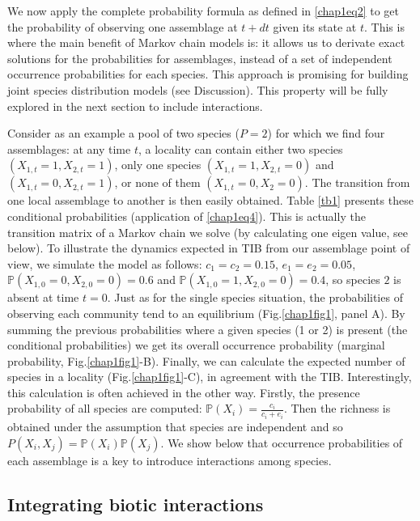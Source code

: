 We now apply the complete probability formula as defined in \eqref{chap1eq2} to get the probability of observing one assemblage at $t+dt$ given its state at $t$. This is where the main benefit of Markov chain models is: it allows us to derivate exact solutions for the probabilities for assemblages, instead of a set of independent occurrence probabilities for each species. This approach is promising for building joint species distribution models (see Discussion). This property will be fully explored in the next section to include interactions.

Consider as an example a pool of two species ($P=2$) for which we find four assemblages: at any time $t$, a locality can contain either two species $(X_{1,t}=1, X_{2,t}=1)$, only one species $(X_{1,t}=1, X_{2,t}=0)$ and $(X_{1,t}=0, X_{2,t}=1)$, or none of them $(X_{1,t}=0, X_2=0)$. The transition from one local assemblage to another is then easily obtained. Table \ref{tb1} presents these conditional probabilities (application of \eqref{chap1eq4}). This is actually the transition matrix of a Markov chain we solve (by calculating one eigen value, see below). To illustrate the dynamics expected in TIB from our assemblage point of view, we simulate the model as follows: $c_1=c_2=0.15$, $e_1=e_2=0.05$, $\mathbb{P}(X_{1,0}=0, X_{2,0}=0)=0.6$ and $\mathbb{P}(X_{1,0}=1, X_{2,0}=0)=0.4$, so species $2$ is absent at time $t=0$.
Just as for the single species situation, the probabilities of observing each community tend to an equilibrium (Fig.\ref{chap1fig1}, panel A). By summing the previous probabilities where a given species (1 or 2) is present (the conditional probabilities) we get its overall occurrence probability (marginal probability, Fig.\ref{chap1fig1}-B). Finally, we can calculate the expected number of species in a locality (Fig.\ref{chap1fig1}-C), in agreement with the TIB. Interestingly, this calculation is often achieved in the other way. Firstly, the presence probability of all species are computed: $\mathbb{P}(X_i)=\frac{c_i}{c_i+e_i}$. Then the richness is obtained under the assumption that species are independent and so $P(X_i,X_j)=\mathbb{P}(X_i)\mathbb{P}(X_j)$. We show below that occurrence probabilities of each assemblage is a key to introduce interactions among species.


\subsection{Integrating biotic interactions}

